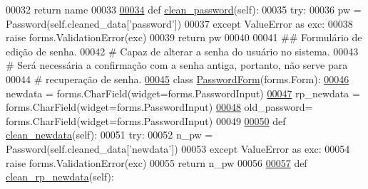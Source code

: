 \begin{DoxyCode}
00032         \textcolor{keywordflow}{return} name
00033 
\hypertarget{Profile_2forms_8py_source_l00034}{}\hyperlink{classProfile_1_1forms_1_1NameForm_aa4cc0c75c2f47602302780502b7c20a0}{00034}     \textcolor{keyword}{def }\hyperlink{classProfile_1_1forms_1_1NameForm_aa4cc0c75c2f47602302780502b7c20a0}{clean\_password}(self):
00035         \textcolor{keywordflow}{try}:
00036             pw = Password(self.cleaned\_data[\textcolor{stringliteral}{'password'}])
00037         \textcolor{keywordflow}{except} ValueError \textcolor{keyword}{as} exc:
00038             \textcolor{keywordflow}{raise} forms.ValidationError(exc)
00039         \textcolor{keywordflow}{return} pw
00040 
00041 \textcolor{comment}{## Formulário de edição de senha.}
00042 \textcolor{comment}{#   Capaz de alterar a senha do usuário no sistema.}
00043 \textcolor{comment}{#   Será necessária a confirmação com a senha antiga, portanto, não serve para}
00044 \textcolor{comment}{#   recuperação de senha.}
\hypertarget{Profile_2forms_8py_source_l00045}{}\hyperlink{classProfile_1_1forms_1_1PasswordForm}{00045} \textcolor{keyword}{class }\hyperlink{classProfile_1_1forms_1_1PasswordForm}{PasswordForm}(forms.Form):
\hypertarget{Profile_2forms_8py_source_l00046}{}\hyperlink{classProfile_1_1forms_1_1PasswordForm_a8000a7fa167f74f0cd554f39dd1e3871}{00046}     newdata     = forms.CharField(widget=forms.PasswordInput)
\hypertarget{Profile_2forms_8py_source_l00047}{}\hyperlink{classProfile_1_1forms_1_1PasswordForm_a7560db05a7e3dfebdd4e95385192b2ad}{00047}     rp\_newdata  = forms.CharField(widget=forms.PasswordInput)
\hypertarget{Profile_2forms_8py_source_l00048}{}\hyperlink{classProfile_1_1forms_1_1PasswordForm_a71438e4977095210067fd7d2f4cf551c}{00048}     old\_password= forms.CharField(widget=forms.PasswordInput)
00049 
\hypertarget{Profile_2forms_8py_source_l00050}{}\hyperlink{classProfile_1_1forms_1_1PasswordForm_a83f03b77492109e21511fa9e97c475ba}{00050}     \textcolor{keyword}{def }\hyperlink{classProfile_1_1forms_1_1PasswordForm_a83f03b77492109e21511fa9e97c475ba}{clean\_newdata}(self):
00051         \textcolor{keywordflow}{try}:
00052             n\_pw = Password(self.cleaned\_data[\textcolor{stringliteral}{'newdata'}])
00053         \textcolor{keywordflow}{except} ValueError \textcolor{keyword}{as} exc:
00054             \textcolor{keywordflow}{raise} forms.ValidationError(exc)
00055         \textcolor{keywordflow}{return} n\_pw
00056 
\hypertarget{Profile_2forms_8py_source_l00057}{}\hyperlink{classProfile_1_1forms_1_1PasswordForm_aca8f863d0640235058984375c3ff5491}{00057}     \textcolor{keyword}{def }\hyperlink{classProfile_1_1forms_1_1PasswordForm_aca8f863d0640235058984375c3ff5491}{clean\_rp\_newdata}(self):

\end{DoxyCode}
